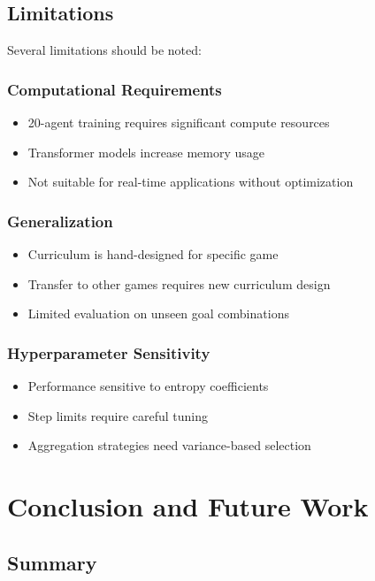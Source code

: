 \documentclass[12pt,a4paper]{article}
\begin{document}
\subsection{Limitations}

Several limitations should be noted:

\subsubsection{Computational Requirements}
\begin{itemize}
    \item 20-agent training requires significant compute resources
    \item Transformer models increase memory usage
    \item Not suitable for real-time applications without optimization
\end{itemize}

\subsubsection{Generalization}
\begin{itemize}
    \item Curriculum is hand-designed for specific game
    \item Transfer to other games requires new curriculum design
    \item Limited evaluation on unseen goal combinations
\end{itemize}

\subsubsection{Hyperparameter Sensitivity}
\begin{itemize}
    \item Performance sensitive to entropy coefficients
    \item Step limits require careful tuning
    \item Aggregation strategies need variance-based selection
\end{itemize}

\section{Conclusion and Future Work}

\subsection{Summary}
\end{document}
